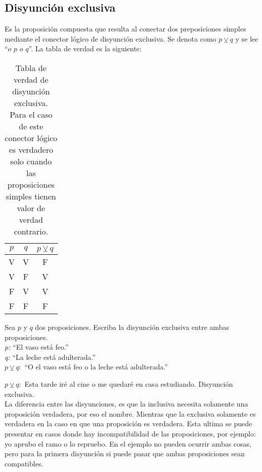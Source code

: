 \subsection{Disyunción exclusiva}
Es la proposición compuesta que resulta al conectar dos preposiciones simples mediante el conector lógico de disyunción exclusiva. Se denota como $p\veebar q$ y se lee ``$o$ $p$ $o$ $q$''. La tabla de verdad es la siguiente:\\
\begin{table}[h!]
	\begin{center}
		\begin{tabular}{|c|c|c|}
\hline
$p$&$q$&$p\veebar q$\\
\hline
V&V&F\\
\hline
V&F&V\\
\hline
F&V&V\\
\hline
F&F&F\\
\hline
		\end{tabular}
\caption[Tabla de verdad del operador lógico disyunción exclusiva.]{Tabla de verdad de disyunción exclusiva. Para el caso de este conector lógico es verdadero solo cuando las proposiciones simples tienen valor de verdad contrario.}
	\end{center}
\end{table}
\begin{myexample}
Sea $p$ y $q$ dos proposiciones. Escriba la disyunción exclusiva entre ambas proposiciones.\\

\noindent\textit{p:} ``El vaso está feo.''\\
\textit{q:} ``La leche está adulterada.''\\
\textit{$p\veebar q:$} ``O el vaso está feo o la leche está adulterada.''\\
\end{myexample}



\noindent $p\veebar q:$ Esta tarde iré al cine o me quedaré en casa estudiando. Disyunción exclusiva.\\

La diferencia entre las disyunciones, es que la inclusiva necesita solamente una proposición verdadera, por eso el nombre. Mientras que la exclusiva solamente es verdadera en la caso en que una proposición es verdadera. Esta ultima se puede presentar en casos donde hay incompatibilidad de las proposiciones, por ejemplo: yo aprubo el ramo o lo repruebo. En el ejemplo no pueden ocurrir ambas cosas, pero para la primera disyunción si puede pasar que ambas proposiciones sean compatibles.
